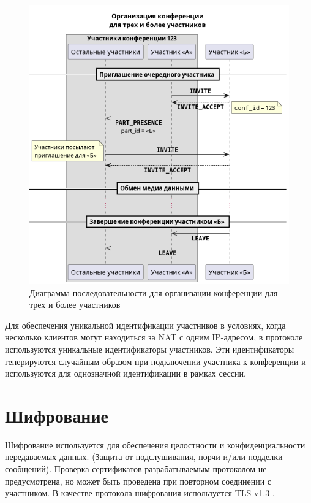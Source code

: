 \begin{figure}[H]
  \centering
  \includegraphics[width=0.9\linewidth]{inc/diag/seq-3/conf-3.png}
  \caption{Диаграмма последовательности для организации конференции для трех и более участников}
  \label{img:conf-3}
\end{figure}

Для обеспечения уникальной идентификации участников в условиях, когда несколько клиентов могут находиться за NAT с одним IP-адресом, в протоколе используются уникальные идентификаторы участников.
Эти идентификаторы генерируются случайным образом при подключении участника к конференции и используются для однозначной идентификации в рамках сессии.

\section{Шифрование}

Шифрование используется для обеспечения целостности и конфиденциальности передаваемых данных. (Защита от подслушивания, порчи и/или подделки сообщений).
Проверка сертификатов разрабатываемым протоколом не предусмотрена, но может быть проведена при повторном соединении с участником.
В качестве протокола шифрования используется TLS v1.3 \cite{tls}.


